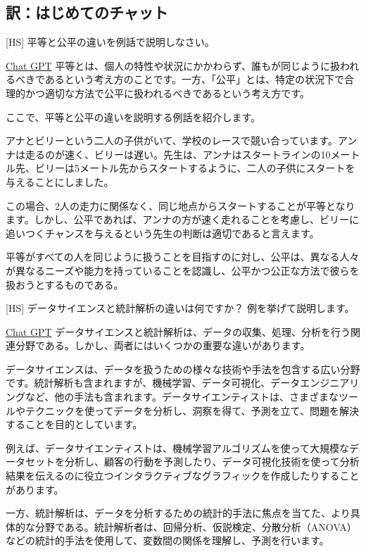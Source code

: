 \documentclass[
]{book}
\theoremstyle{definition}
\theoremstyle{definition}
\theoremstyle{definition}
\theoremstyle{definition}
\theoremstyle{remark}
\begin{document}
\hypertarget{firstchatj}{%
\subsection{訳：はじめてのチャット}\label{firstchatj}}

{[}HS{]} 平等と公平の違いを例話で説明しなさい。

\protect\hyperlink{chatgpt}{Chat GPT} 平等とは、個人の特性や状況にかかわらず、誰もが同じように扱われるべきであるという考え方のことです。一方、「公平」とは、特定の状況下で合理的かつ適切な方法で公平に扱われるべきであるという考え方です。

ここで、平等と公平の違いを説明する例話を紹介します。

アナとビリーという二人の子供がいて、学校のレースで競い合っています。アンナは走るのが速く、ビリーは遅い。先生は、アンナはスタートラインの10メートル先、ビリーは5メートル先からスタートするように、二人の子供にスタートを与えることにしました。

この場合、2人の走力に関係なく、同じ地点からスタートすることが平等となります。しかし、公平であれば、アンナの方が速く走れることを考慮し、ビリーに追いつくチャンスを与えるという先生の判断は適切であると言えます。

平等がすべての人を同じように扱うことを目指すのに対し、公平は、異なる人々が異なるニーズや能力を持っていることを認識し、公平かつ公正な方法で彼らを扱おうとするものである。

{[}HS{]} データサイエンスと統計解析の違いは何ですか？ 例を挙げて説明します。

\protect\hyperlink{chatgpt}{Chat GPT} データサイエンスと統計解析は、データの収集、処理、分析を行う関連分野である。しかし、両者にはいくつかの重要な違いがあります。

データサイエンスは、データを扱うための様々な技術や手法を包含する広い分野です。統計解析も含まれますが、機械学習、データ可視化、データエンジニアリングなど、他の手法も含まれます。データサイエンティストは、さまざまなツールやテクニックを使ってデータを分析し、洞察を得て、予測を立て、問題を解決することを目的としています。

例えば、データサイエンティストは、機械学習アルゴリズムを使って大規模なデータセットを分析し、顧客の行動を予測したり、データ可視化技術を使って分析結果を伝えるのに役立つインタラクティブなグラフィックを作成したりすることがあります。

一方、統計解析は、データを分析するための統計的手法に焦点を当てた、より具体的な分野である。統計解析者は、回帰分析、仮説検定、分散分析（ANOVA）などの統計的手法を使用して、変数間の関係を理解し、予測を行います。
\end{document}
